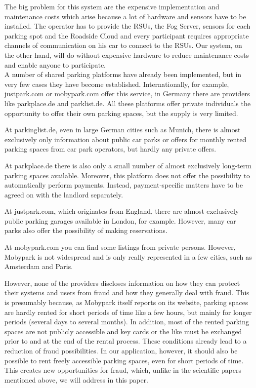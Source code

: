 The big problem for this system are the expensive implementation and maintenance costs which arise because a lot of hardware and sensors have to be installed. The operator has to provide the RSUs, the Fog Server, sensors for each parking spot and the Roadside Cloud and every participant requires appropriate channels of communication on his car to connect to the RSUs. Our system, on the other hand, will do without expensive hardware to reduce maintenance costs and enable anyone to participate.\\


A number of shared parking platforms have already been implemented, but in very few cases they have become established. Internationally, for example, justpark.com or mobypark.com offer this service, in Germany there are providers like parkplace.de and parklist.de. All these platforms offer private individuals the opportunity to offer their own parking spaces, but the supply is very limited.

At parkinglist.de, even in large German cities such as Munich, there is almost exclusively only information about public car parks or offers for monthly rented parking spaces from car park operators, but hardly any private offers.

At parkplace.de there is also only a small number of almost exclusively long-term parking spaces available. Moreover, this platform does not offer the possibility to automatically perform payments. Instead, payment-specific matters have to be agreed on with the landlord separately.

At justpark.com, which originates from England, there are almost exclusively public parking garages available in London, for example. However, many car parks also offer the possibility of making reservations.

At mobypark.com you can find some listings from private persons. However, Mobypark is not widespread and is only really represented in a few cities, such as Amsterdam and Paris.

However, none of the providers discloses information on how they can protect their systems and users from fraud and how they generally deal with fraud. This is presumably because, as Mobypark itself reports on its website, parking spaces are hardly rented for short periods of time like a few hours, but mainly for longer periods (several days to several months). In addition, most of the rented parking spaces are not publicly accessible and key cards or the like must be exchanged prior to and at the end of the rental process. These conditions already lead to a reduction of fraud possibilities. In our application, however, it should also be possible to rent freely accessible parking spaces, even for short periods of time. This creates new opportunities for fraud, which, unlike in the scientific papers mentioned above, we will address in this paper.

